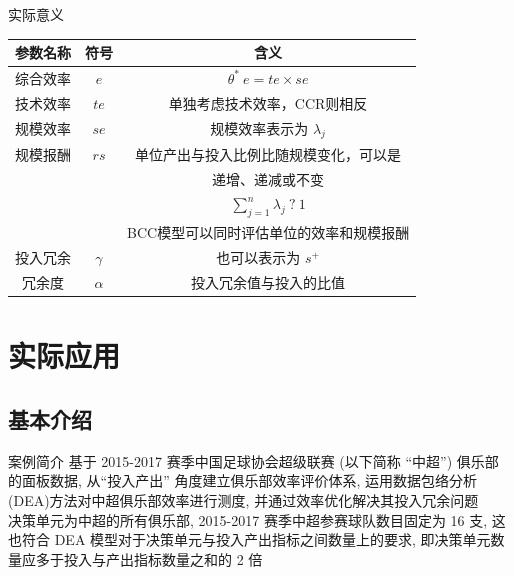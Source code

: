 \documentclass[]{beamer}
\begin{document}

\begin{frame}{实际意义}
    \begin{tabular}{ccc}
        \toprule
        参数名称 & 符号 & 含义\\
        \midrule
        综合效率 & $e$ & $\theta^* \ e = te \times se$\\
        技术效率 & $te$ & 单独考虑技术效率，CCR则相反\\
        规模效率 & $se$ & 规模效率表示为 $\lambda_j$\\
        规模报酬 & $rs$ & 单位产出与投入比例比随规模变化，可以是\\
        & &递增、递减或不变\\
        & &$\sum_{j=1}^{n}{\lambda_j} \ ? \ 1 $\\
        & &BCC模型可以同时评估单位的效率和规模报酬\\
        投入冗余 & $\gamma$ & 也可以表示为 $s^{+}$\\
        冗余度 & $\alpha$ & 投入冗余值与投入的比值\\
        \bottomrule
    \end{tabular}
\end{frame}

\section{实际应用}

\subsection{基本介绍}

\begin{frame}{案例简介}
    基于 2015-2017 赛季中国足球协会超级联赛 (以下简称 “中超”) 俱乐部的面板数据, 从“投入产出” 角度建立俱乐部效率评价体系, 运用数据包络分析 (DEA)方法对中超俱乐部效率进行测度, 并通过效率优化解决其投入冗余问题\\
    决策单元为中超的所有俱乐部, 2015-2017 赛季中超参赛球队数目固定为 16 支, 这也符合 DEA 模型对于决策单元与投入产出指标之间数量上的要求, 即决策单元数量应多于投入与产出指标数量之和的 2 倍
\end{frame}
\end{document}
